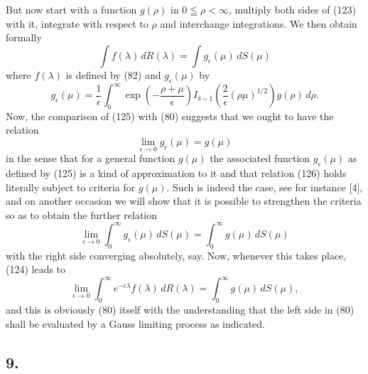 \documentclass[12pt]{article}
\begin{document}
But now start with a function \(g(\rho)\) in \(0 \leqq \rho < \infty\), multiply both sides of (123) with it, integrate with respect to \(\rho\) and interchange integrations. We then obtain formally
\begin{equation}
\int f(\lambda) \, dR(\lambda) = \int g_\epsilon(\mu) \, dS(\mu)
\tag{124}
\end{equation}
where \(f(\lambda)\) is defined by (82) and \(g_\epsilon(\mu)\) by
\begin{equation}
g_\epsilon(\mu) = \frac{1}{\epsilon} \int_0^{\infty} \exp \left( -\frac{\rho + \mu}{\epsilon} \right) I_{\delta-1} \left( \frac{2}{\epsilon} (\rho\mu)^{1/2} \right) g(\rho) \, d\rho.
\tag{125}
\end{equation}
Now, the comparison of (125) with (80) suggests that we ought to have the relation
\begin{equation}
\lim_{\epsilon \to 0} g_\epsilon(\mu) = g(\mu)
\tag{126}
\end{equation}
in the sense that for a general function \(g(\mu)\) the associated function \(g_\epsilon(\mu)\) as defined by (125) is a kind of approximation to it and that relation (126) holds literally subject to criteria for \(g(\mu)\). Such is indeed the case, see for instance [4], and on another occasion we will show that it is possible to strengthen the criteria so as to obtain the further relation
\begin{equation}
\lim_{\epsilon \to 0} \int_0^{\infty} g_\epsilon(\mu) \, dS(\mu) = \int_0^{\infty} g(\mu) \, dS(\mu)
\tag{127}
\end{equation}
with the right side converging absolutely, say. Now, whenever this takes place, (124) leads to
\begin{equation}
\lim_{\epsilon \to 0} \int_0^{\infty} e^{-\epsilon\lambda} f(\lambda) \, dR(\lambda) = \int_0^{\infty} g(\mu) \, dS(\mu),
\tag{128}
\end{equation}
and this is obviously (80) itself with the understanding that the left side in (80) shall be evaluated by a Gauss limiting process as indicated.

\subsection*{9.}
\end{document}
